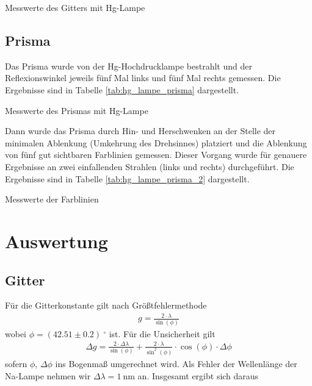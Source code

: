 \documentclass{article}
\begin{document}
\begin{table}[H]
\caption{Messwerte des Gitters mit Hg-Lampe}
\label{tab:hg_lampe}
\centering

\end{table}



\subsection{Prisma}

Das Prisma wurde von der Hg-Hochdrucklampe bestrahlt und der Reflexionswinkel jeweils fünf Mal links und fünf Mal rechts gemessen. Die Ergebnisse sind in Tabelle \ref{tab:hg_lampe_prisma} dargestellt.


\begin{table}[H]
\caption{Messwerte des Prismas mit Hg-Lampe}
\label{tab:hg_lampe_prisma}
\centering

\end{table}

Dann wurde das Prisma durch Hin- und Herschwenken an der Stelle der minimalen Ablenkung (Umkehrung des Drehsinnes) platziert und die Ablenkung von fünf gut sichtbaren Farblinien gemessen. Dieser Vorgang wurde für genauere Ergebnisse an zwei einfallenden Strahlen (links und rechts) durchgeführt. Die Ergebnisse sind in Tabelle \ref{tab:hg_lampe_prisma_2} dargestellt.

\begin{table}[H]
\caption{Messwerte der Farblinien}
\label{tab:hg_lampe_prisma_2}
\centering

\end{table}


\section{Auswertung}

\subsection{Gitter}
Für die Gitterkonstante gilt nach Größtfehlermethode
\begin{align*}
g = \frac{2\cdot \lambda}{\sin(\phi)}
\end{align*}
 wobei $\phi = (42.51 \pm 0.2) ~^\circ$ ist. Für die Unsicherheit gilt
\begin{align*}
\Delta g = \frac{2\cdot\Delta \lambda}{\sin(\phi)} + \frac{2\cdot\lambda}{\sin^2(\phi)}\cdot \cos(\phi)\cdot \Delta\phi
\end{align*}
sofern $\phi$, $\Delta\phi$ ins Bogenmaß umgerechnet wird. Als Fehler der Wellenlänge der Na-Lampe nehmen wir $\Delta\lambda = 1~$nm an. Insgesamt ergibt sich daraus 

\end{document}
